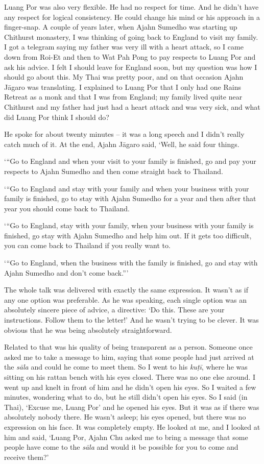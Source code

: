 Luang Por was also very flexible. He had no respect for time. And he
didn't have any respect for logical consistency. He could change his
mind or his approach in a finger-snap. A couple of years later, when
Ajahn Sumedho was starting up Chithurst monastery, I was thinking of
going back to England to visit my family. I got a telegram saying my
father was very ill with a heart attack, so I came down from Roi-Et and
then to Wat Pah Pong to pay respects to Luang Por and ask his advice. I
felt I should leave for England soon, but my question was how I should
go about this. My Thai was pretty poor, and on that occasion Ajahn
Jāgaro was translating. I explained to Luang Por that I only had one
Rains Retreat as a monk and that I was from England; my family lived
quite near Chithurst and my father had just had a heart attack and was
very sick, and what did Luang Por think I should do?

He spoke for about twenty minutes -- it was a long speech and I didn't
really catch much of it. At the end, Ajahn Jāgaro said, `Well, he said
four things. 

`\thinspace ``Go to England and when your visit to your family is finished, go and
pay your respects to Ajahn Sumedho and then come straight back to
Thailand.

`\thinspace ``Go to England and stay with your family and when your business with
your family is finished, go to stay with Ajahn Sumedho for a year and
then after that year you should come back to Thailand.

`\thinspace ``Go to England, stay with your family, when your business with your
family is finished, go stay with Ajahn Sumedho and help him out. If it
gets too difficult, you can come back to Thailand if you really want
to.

`\thinspace ``Go to England, when the business with the family is finished, go
and stay with Ajahn Sumedho and don't come back.''\thinspace '

The whole talk was delivered with exactly the same expression. It wasn't
as if any one option was preferable. As he was speaking, each single
option was an absolutely sincere piece of advice, a directive: `Do this. 
These are your instructions. Follow them to the letter!' And he wasn't
trying to be clever. It was obvious that he was being absolutely
straightforward.

Related to that was his quality of being transparent as a person. 
Someone once asked me to take a message to him, saying that some people
had just arrived at the \emph{sāla} and could he come to meet them. So I went
to his \emph{kuṭī}, where he was sitting on his rattan bench with his
eyes closed. There was no one else around. I went up and knelt in front
of him and he didn't open his eyes. So I waited a few minutes, wondering
what to do, but he still didn't open his eyes. So I said (in Thai), 
`Excuse me, Luang Por' and he opened his eyes. But it was as if there
was absolutely nobody there. He wasn't asleep; his eyes opened, but
there was no expression on his face. It was completely empty. He looked
at me, and I looked at him and said, `Luang Por, Ajahn Chu asked me to
bring a message that some people have come to the \emph{sāla} and would
it be possible for you to come and receive them?'

